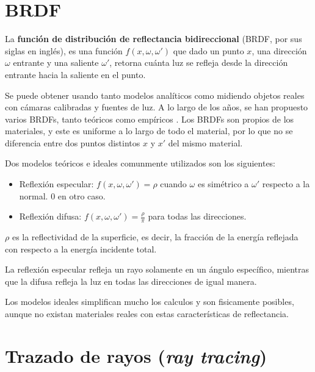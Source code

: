 \section{BRDF}\label{sec:brdf}

La \textbf{función de distribución de reflectancia bidireccional} (BRDF, por sus siglas en inglés), es una función $f(x, \omega, \omega')$ que dado un punto $x$, una dirección $\omega$ entrante y una saliente $\omega'$, retorna cuánta luz se refleja desde la dirección entrante hacia la saliente en el punto.

Se puede obtener usando tanto modelos analíticos como midiendo objetos reales con cámaras calibradas y fuentes de luz.
A lo largo de los años, se han propuesto varios BRDFs, tanto teóricos como empíricos \cite{review-of-brdf-models}.
Los BRDFs son propios de los materiales, y este es uniforme a lo largo de todo el material, por lo que no se diferencia entre dos puntos distintos $x$ y $x'$ del mismo material.


Dos modelos teóricos e ideales comunmente utilizados son los siguientes:

\begin{itemize}
    \item Reflexión especular: $f(x, \omega, \omega') = \rho$ cuando $\omega$ es simétrico a $\omega'$ respecto a la normal. $0$ en otro caso.
    \item Reflexión difusa: $f(x, \omega, \omega') = \frac{\rho}{\pi}$ para todas las direcciones.
\end{itemize}

$\rho$ es la reflectividad de la superficie, es decir, la fracción de la energía reflejada con respecto a la energía incidente total.

La reflexión especular refleja un rayo solamente en un ángulo específico,
mientras que la difusa refleja la luz en todas las direcciones de igual manera.

Los modelos ideales simplifican mucho los calculos y son fisicamente posibles, aunque no existan materiales reales con estas características de reflectancia.

\section{Trazado de rayos (\textit{ray tracing})}\label{sec:ray-tracing}

